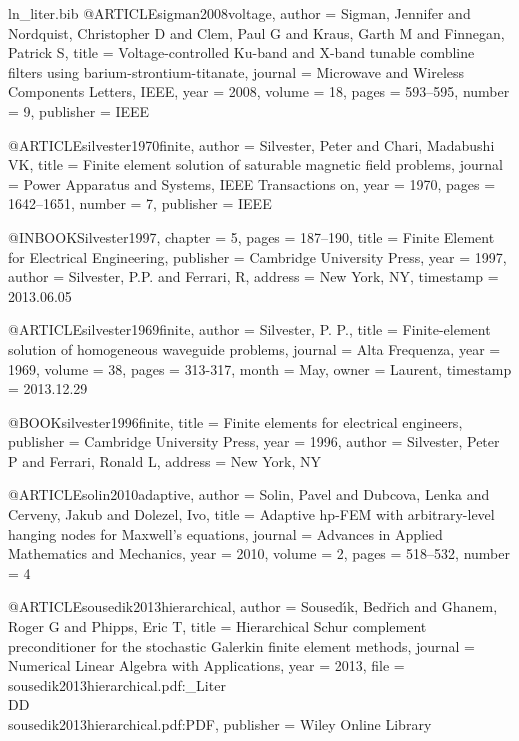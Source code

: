 \begin{filecontents*}{ln_liter.bib}
@ARTICLE{sigman2008voltage,
  author = {Sigman, Jennifer and Nordquist, Christopher D and Clem, Paul G and
	Kraus, Garth M and Finnegan, Patrick S},
  title = {Voltage-controlled {Ku}-band and {X}-band tunable combline filters
	using barium-strontium-titanate},
  journal = {Microwave and Wireless Components Letters, IEEE},
  year = {2008},
  volume = {18},
  pages = {593--595},
  number = {9},
  publisher = {IEEE}
}

@ARTICLE{silvester1970finite,
  author = {Silvester, Peter and Chari, Madabushi VK},
  title = {Finite element solution of saturable magnetic field problems},
  journal = {Power Apparatus and Systems, IEEE Transactions on},
  year = {1970},
  pages = {1642--1651},
  number = {7},
  publisher = {IEEE}
}

@INBOOK{Silvester1997,
  chapter = {5},
  pages = {187--190},
  title = {Finite Element for Electrical Engineering},
  publisher = {Cambridge University Press},
  year = {1997},
  author = {Silvester, P.P. and Ferrari, R},
  address = {New York, NY},
  timestamp = {2013.06.05}
}

@ARTICLE{silvester1969finite,
  author = {Silvester, P. P.},
  title = {Finite-element solution of homogeneous waveguide problems},
  journal = {Alta Frequenza},
  year = {1969},
  volume = {38},
  pages = {313-317},
  month = {May},
  owner = {Laurent},
  timestamp = {2013.12.29}
}

@BOOK{silvester1996finite,
  title = {Finite elements for electrical engineers},
  publisher = {Cambridge University Press},
  year = {1996},
  author = {Silvester, Peter P and Ferrari, Ronald L},
  address = {{New York}, NY}
}

@ARTICLE{solin2010adaptive,
  author = {Solin, Pavel and Dubcova, Lenka and Cerveny, Jakub and Dolezel, Ivo},
  title = {Adaptive hp-{FEM} with arbitrary-level hanging nodes for {M}axwell's
	equations},
  journal = {Advances in Applied Mathematics and Mechanics},
  year = {2010},
  volume = {2},
  pages = {518--532},
  number = {4}
}

@ARTICLE{sousedik2013hierarchical,
  author = {Soused{\'\i}k, Bed{\v{r}}ich and Ghanem, Roger G and Phipps, Eric
	T},
  title = {Hierarchical Schur complement preconditioner for the stochastic Galerkin
	finite element methods},
  journal = {Numerical Linear Algebra with Applications},
  year = {2013},
  file = {sousedik2013hierarchical.pdf:_Liter\\DD\\sousedik2013hierarchical.pdf:PDF},
  publisher = {Wiley Online Library}
}


\end{filecontents*}
